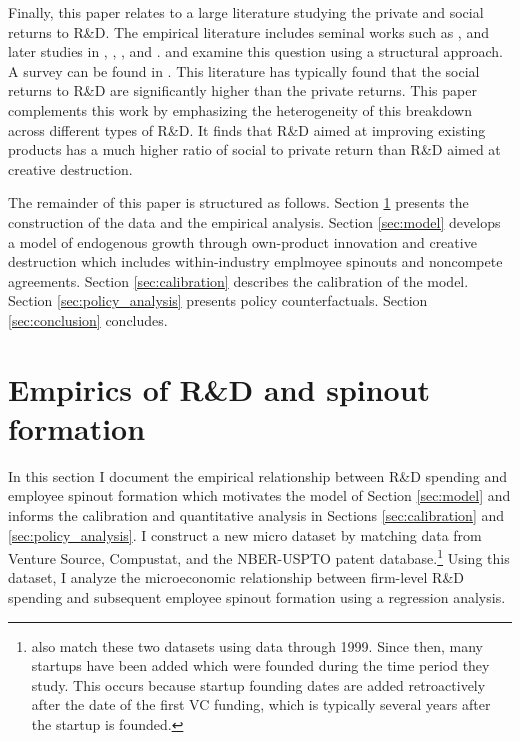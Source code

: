 \documentclass[ecta,nameyear,final]{econsocart}
\theoremstyle{plain}
\theoremstyle{remark}
\begin{document}
Finally, this paper relates to a large literature studying the private and social returns to R\&D. The empirical literature includes seminal works such as \cite{griliches_issues_1979}, \cite{griliches_search_1992} and later studies in \cite{bloom_identifying_2013}, \cite{harrison_does_2014}, \cite{mohnen_innovation_2013}, and \cite{doraszelski_rd_2013}. \cite{jones_measuring_1998} and \cite{comin_rd_2004} examine this question using a structural approach. A survey can be found in \cite{hall_chapter_2010}. This literature has typically found that the social returns to R\&D are significantly higher than the private returns. This paper complements this work by emphasizing the heterogeneity of this breakdown across different types of R\&D. It finds that R\&D aimed at improving existing products has a much higher ratio of social to private return than R\&D aimed at creative destruction.

The remainder of this paper is structured as follows. Section \ref{sec:empirics} presents the construction of the data and the empirical analysis. Section \ref{sec:model} develops a model of endogenous growth through own-product innovation and creative destruction which includes within-industry emplmoyee spinouts and noncompete agreements. Section \ref{sec:calibration} describes the calibration of the model. Section \ref{sec:policy_analysis} presents policy counterfactuals. Section \ref{sec:conclusion} concludes. 


\section{Empirics of R\&D and spinout formation}\label{sec:empirics}

In this section I document the empirical relationship between R\&D spending and employee spinout formation which motivates the model of Section \ref{sec:model} and informs the calibration and quantitative analysis in Sections \ref{sec:calibration} and \ref{sec:policy_analysis}. I construct a new micro dataset by matching data from Venture Source, Compustat, and the NBER-USPTO patent database.\footnote{\cite{gompers_entrepreneurial_2005} also match these two datasets using data through 1999. Since then, many startups have been added which were founded during the time period they study. This occurs because startup founding dates are added retroactively after the date of the first VC funding, which is typically several years after the startup is founded.} Using this dataset, I analyze the microeconomic relationship between firm-level R\&D spending and subsequent employee spinout formation using a regression analysis.
\end{document}
